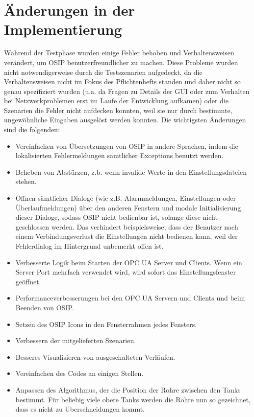\documentclass[parskip=full]{scrartcl}
\begin{document}
\section{Änderungen in der Implementierung}
Während der Testphase wurden einige Fehler behoben und Verhaltensweisen verändert, um OSIP benutzerfreundlicher zu machen.
Diese Probleme wurden nicht notwendigerweise durch die Testszenarien aufgedeckt, da die Verhaltensweisen nicht im Fokus des
Pflichtenhefts standen und daher nicht so genau spezifiziert wurden (u.a. da Fragen zu Details der GUI oder zum Verhalten bei Netzwerkproblemen
erst im Laufe der Entwicklung aufkamen) oder die Szenarien die Fehler nicht aufdecken konnten, weil sie nur durch bestimmte,
ungewöhnliche Eingaben ausgelöst werden konnten. Die wichtigsten Änderungen sind die folgenden:

\begin{itemize}
 \item Vereinfachen von Übersetzungen von OSIP in andere Sprachen, indem die lokalisierten Fehlermeldungen sämtlicher Exceptions benutzt werden.
 \item Beheben von Abstürzen, z.b. wenn invalide Werte in den Einstellungsdateien stehen.
 \item Öffnen sämtlicher Dialoge (wie z.B. Alarmmeldungen, Einstellungen oder Überlaufmeldungen) über den anderen Fenstern und modale Initialisierung dieser Dialoge,
 sodass OSIP nicht bedienbar ist, solange diese nicht geschlossen werden. Das verhindert beispielsweise, dass der Benutzer nach einem Verbindungsverlust
 die Einstellungen nicht bedienen kann, weil der Fehlerdialog im Hintergrund unbemerkt offen ist.
 \item Verbesserte Logik beim Starten der OPC UA Server und Clients. Wenn ein Server Port mehrfach verwendet wird, wird sofort das
 Einstellungsfenster geöffnet.
 \item Performanceverbesserungen bei den OPC UA Servern und Clients und beim Beenden von OSIP.
 \item Setzen des OSIP Icons in den Fensterrahmen jedes Fensters.
 \item Verbessern der mitgelieferten Szenarien.
 \item Besseres Visualisieren von ausgeschalteten Verläufen.
 \item Vereinfachen des Codes an einigen Stellen.
 \item Anpassen des Algorithmus, der die Position der Rohre zwischen den Tanks bestimmt. Für beliebig viele obere Tanks werden die Rohre nun so gezeichnet,
	dass es nicht zu Überschneidungen kommt.
\end{itemize}
\end{document}
